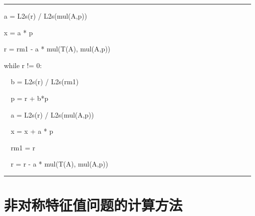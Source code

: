 \documentclass[a4paper,UTF8,fontset=windows]{ctexart}
\newenvironment{code}{\rule{36em}{0.1em}\setlength{\parindent}{1em}\setmainfont{Consolas}

}{

\setlength{\parindent}{0em}\rule{36em}{0.1em}}
\begin{document}
\begin{enumerate}
\begin{code}
a = L2s(r) / L2s(mul(A,p))

x = a * p

r = rm1 - a * mul(T(A), mul(A,p))

while r != 0:

\ \ b = L2s(r) / L2s(rm1)

\ \ p = r + b*p

\ \ a = L2s(r) / L2s(mul(A,p))

\ \ x = x + a * p

\ \ rm1 = r

\ \ r = r - a * mul(T(A), mul(A,p))

\end{code}
\end{enumerate}

\section{非对称特征值问题的计算方法}
\end{document}
